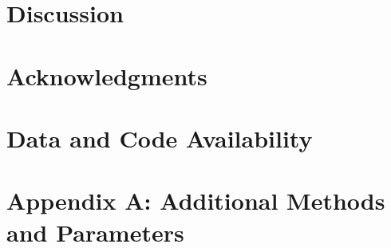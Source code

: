 \documentclass[11pt]{article}
\begin{document}
\section*{Discussion}


\section*{Acknowledgments}


\section*{Data and Code Availability}

\section*{Appendix A: Additional Methods and Parameters}

%
%
%
%

\renewcommand{\theequation}{A\arabic{equation}}
\renewcommand{\thetable}{A\arabic{table}}
\setcounter{equation}{0}  %
\setcounter{figure}{0}
\setcounter{table}{0}
\end{document}
